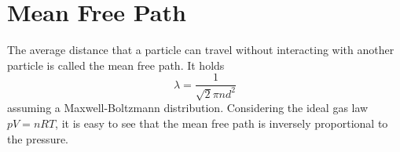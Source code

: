 \section{Mean Free Path}
The average distance that a particle can travel without interacting with another particle is called the mean free path.
It holds
\begin{equation}
	\lambda=\frac{1}{\sqrt{2}\pi n d^2}
\end{equation}
assuming a Maxwell-Boltzmann distribution.
Considering the ideal gas law $pV=nRT$, it is easy to see that the mean free path is inversely proportional to the pressure.
